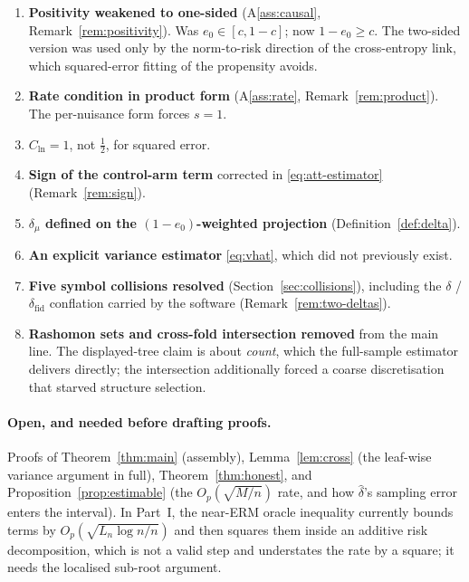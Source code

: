 \documentclass[11pt]{article}
\theoremstyle{plain}
\theoremstyle{definition}
\theoremstyle{remark}
\newcommand{\ez}{e_0}
\newcommand{\dhat}{\widehat{\delta}}
\begin{document}
\begin{enumerate}[label=(\arabic*)]
  \item \textbf{Positivity weakened to one-sided} (A\ref{ass:causal},
  Remark~\ref{rem:positivity}). Was $\ez\in[c,1-c]$; now $1-\ez\ge c$. The
  two-sided version was used only by the norm-to-risk direction of the
  cross-entropy link, which squared-error fitting of the propensity avoids.
  \item \textbf{Rate condition in product form} (A\ref{ass:rate},
  Remark~\ref{rem:product}). The per-nuisance form forces $s=1$.
  \item \textbf{$C_{\mathrm{ln}}=1$}, not $\tfrac12$, for squared error.
  \item \textbf{Sign of the control-arm term} corrected in
  \eqref{eq:att-estimator} (Remark~\ref{rem:sign}).
  \item \textbf{$\delta_\mu$ defined on the $(1-\ez)$-weighted projection}
  (Definition~\ref{def:delta}).
  \item \textbf{An explicit variance estimator} \eqref{eq:vhat}, which did not
  previously exist.
  \item \textbf{Five symbol collisions resolved} (Section~\ref{sec:collisions}),
  including the $\delta$ / $\delta_{\mathrm{fid}}$ conflation carried by the
  software (Remark~\ref{rem:two-deltas}).
  \item \textbf{Rashomon sets and cross-fold intersection removed} from the main
  line. The displayed-tree claim is about \emph{count}, which the full-sample
  estimator delivers directly; the intersection additionally forced a coarse
  discretisation that starved structure selection.
\end{enumerate}

\paragraph{Open, and needed before drafting proofs.}
Proofs of Theorem~\ref{thm:main} (assembly), Lemma~\ref{lem:cross} (the
leaf-wise variance argument in full), Theorem~\ref{thm:honest}, and
Proposition~\ref{prop:estimable} (the $O_p(\sqrt{M/n})$ rate, and how
$\dhat$'s sampling error enters the interval). In Part~I,
the near-ERM oracle inequality currently bounds terms by
$O_p(\sqrt{L_n\log n/n})$ and then squares them inside an additive risk
decomposition, which is not a valid step and understates the rate by a square;
it needs the localised sub-root argument.
\end{document}
